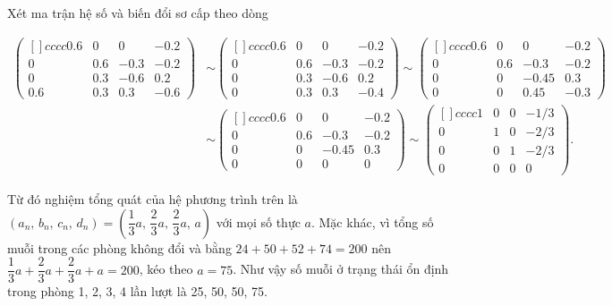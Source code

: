\begin{enumerate}
{    Xét ma trận hệ số và biến đổi sơ cấp theo dòng
    
    \begin{align*}
        \begin{pmatrix}[]{cccc}
            0.6 & 0 & 0 & -0.2 \\
            0 & 0.6 & -0.3 & -0.2 \\
            0 & 0.3 & -0.6 & 0.2 \\
            0.6 & 0.3 & 0.3 & -0.6 
        \end{pmatrix} & \sim \begin{pmatrix}[]{cccc}
            0.6 & 0 & 0 & -0.2 \\
            0 & 0.6 & -0.3 & -0.2 \\
            0 & 0.3 & -0.6 & 0.2 \\
            0 & 0.3 & 0.3 & -0.4 
        \end{pmatrix} \sim \begin{pmatrix}[]{cccc}
            0.6 & 0 & 0 & -0.2 \\
            0 & 0.6 & -0.3 & -0.2 \\
            0 & 0 & -0.45 & 0.3 \\
            0 & 0 & 0.45 & -0.3 
        \end{pmatrix} \\ & \sim \begin{pmatrix}[]{cccc}
            0.6 & 0 & 0 & -0.2 \\
            0 & 0.6 & -0.3 & -0.2 \\
            0 & 0 & -0.45 & 0.3 \\
            0 & 0 & 0 & 0
        \end{pmatrix} \sim \begin{pmatrix}[]{cccc}
            1 & 0 & 0 & -1/3 \\
            0 & 1 & 0 & -2/3 \\
            0 & 0 & 1 & -2/3 \\
            0 & 0 & 0 & 0
        \end{pmatrix}.
    \end{align*}
    
    Từ đó nghiệm tổng quát của hệ phương trình trên là $(a_n,\,b_n,\,c_n,\,d_n) = \left(\dfrac{1}{3}a,\,\dfrac{2}{3}a,\,\dfrac{2}{3}a,\,a\right)$ với mọi số thực $a$. Mặc khác, vì tổng số muỗi trong các phòng không đổi và bằng $24 + 50 + 52 + 74 = 200$ nên $\dfrac{1}{3}a + \dfrac{2}{3}a + \dfrac{2}{3}a + a = 200$, kéo theo $a = 75$. Như vậy số muỗi ở trạng thái ổn định trong phòng 1, 2, 3, 4 lần lượt là 25, 50, 50, 75.}
\end{enumerate}

